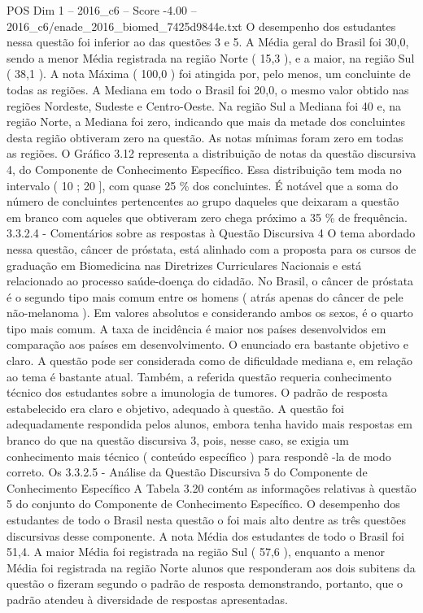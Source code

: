 \begin{textsample}{POS Dim 1 – 2016\_c6 – Score -4.00 – 2016\_c6/enade\_2016\_biomed\_7425d9844e.txt}
O desempenho dos estudantes nessa questão foi inferior ao das questões 3 e 5.
A Média geral do Brasil foi 30,0, sendo a menor Média registrada na região Norte ( 15,3 ), e a maior, na região Sul ( 38,1 ).
A nota Máxima ( 100,0 ) foi atingida por, pelo menos, um concluinte de todas as regiões.
A Mediana em todo o Brasil foi 20,0, o mesmo valor obtido nas regiões Nordeste, Sudeste e Centro-Oeste.
Na região Sul a Mediana foi 40 e, na região Norte, a Mediana foi zero, indicando que mais da metade dos concluintes desta região obtiveram zero na questão.
As notas mínimas foram zero em todas as regiões.
O Gráfico 3.12 representa a distribuição de notas da questão discursiva 4, do Componente de Conhecimento Específico.
Essa distribuição tem moda no intervalo ( 10 ; 20 ], com quase 25 \% dos concluintes.
É notável que a soma do número de concluintes pertencentes ao grupo daqueles que deixaram a questão em branco com aqueles que obtiveram zero chega próximo a 35 \% de frequência. 3.3.2.4 - Comentários sobre as respostas à Questão Discursiva 4 O tema abordado nessa questão, câncer de próstata, está alinhado com a proposta para os cursos de graduação em Biomedicina nas Diretrizes Curriculares Nacionais e está relacionado ao processo saúde-doença do cidadão.
No Brasil, o câncer de próstata é o segundo tipo mais comum entre os homens ( atrás apenas do câncer de pele não-melanoma ).
Em valores absolutos e considerando ambos os sexos, é o quarto tipo mais comum.
A taxa de incidência é maior nos países desenvolvidos em comparação aos países em desenvolvimento.
O enunciado era bastante objetivo e claro.
A questão pode ser considerada como de dificuldade mediana e, em relação ao tema é bastante atual.
Também, a referida questão requeria conhecimento técnico dos estudantes sobre a imunologia de tumores.
O padrão de resposta estabelecido era claro e objetivo, adequado à questão.
A questão foi adequadamente respondida pelos alunos, embora tenha havido mais respostas em branco do que na questão discursiva 3, pois, nesse caso, se exigia um conhecimento mais técnico ( conteúdo específico ) para respondê -la de modo correto.
Os 3.3.2.5 - Análise da Questão Discursiva 5 do Componente de Conhecimento Específico A Tabela 3.20 contém as informações relativas à questão 5 do conjunto do Componente de Conhecimento Específico.
O desempenho dos estudantes de todo o Brasil nesta questão o foi mais alto dentre as três questões discursivas desse componente.
A nota Média dos estudantes de todo o Brasil foi 51,4.
A maior Média foi registrada na região Sul ( 57,6 ), enquanto a menor Média foi registrada na região Norte alunos que responderam aos dois subitens da questão o fizeram segundo o padrão de resposta demonstrando, portanto, que o padrão atendeu à diversidade de respostas apresentadas.

\end{textsample}
